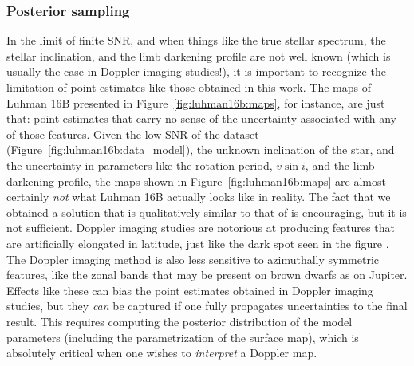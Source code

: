 \documentclass[modern]{aastex631}
\begin{document}
\subsubsection{Posterior sampling}
\label{sec:discussion:priors:mcmc}
%
In the limit of finite SNR, and when things like the true stellar spectrum, the stellar inclination, and the limb darkening profile are not well known (which is usually the case in Doppler imaging studies!), it is important to recognize the limitation of point estimates like those obtained in this work.
The maps of Luhman 16B presented in Figure~\ref{fig:luhman16b:maps}, for instance, are just that: point estimates that carry no sense of the uncertainty associated with any of those features.
Given the low SNR of the dataset (Figure~\ref{fig:luhman16b:data_model}), the unknown inclination of the star, and the uncertainty in parameters like the rotation period, $v\sin i$, and the limb darkening profile, the maps shown in Figure~\ref{fig:luhman16b:maps} are almost certainly \emph{not} what Luhman 16B actually looks like in reality.
The fact that we obtained a solution that is qualitatively similar to that of \citet{Crossfield2014} is encouraging, but it is not sufficient.
Doppler imaging studies are notorious at producing features that are artificially elongated in latitude, just like the dark spot seen in the figure .
The Doppler imaging method is also less sensitive to azimuthally symmetric features, like the zonal bands that may be present on brown dwarfs as on Jupiter.
Effects like these can bias the point estimates obtained in Doppler imaging studies, but they \emph{can} be captured if one fully propagates uncertainties to the final result.
This requires computing the posterior distribution of the model parameters (including the parametrization of the surface map), which is absolutely critical when one wishes to \emph{interpret} a Doppler map.
\end{document}
